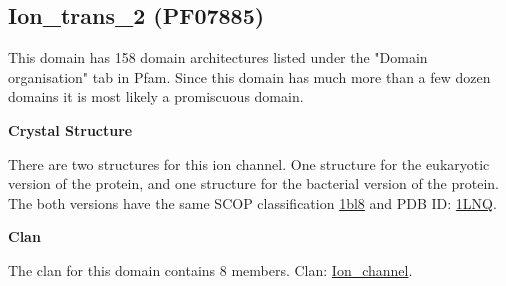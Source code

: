\documentclass[11pt]{article}
\begin{document}
\subsection*{Ion\_trans\_2 (PF07885)}

This domain has 158 domain architectures listed under the "Domain organisation" tab in Pfam.
Since this domain has much more than a few dozen domains it is most likely a promiscuous domain.

{\bf Crystal Structure}

There are two structures for this ion channel. One structure for the eukaryotic
version of the protein, and one structure for the bacterial version of the protein.
The both versions have the same SCOP classification \href{http://scop.mrc-lmb.cam.ac.uk/scop/search.cgi?tlev=fa;&pdb=1bl8}{1bl8}
and PDB ID: \href{http://pfam.sanger.ac.uk/structure/1LNQ}{1LNQ}.

{\bf Clan}

The clan for this domain contains 8 members. Clan: \href{http://pfam.sanger.ac.uk/clan/Ion\_channel}{Ion\_channel}. 
\end{document}
